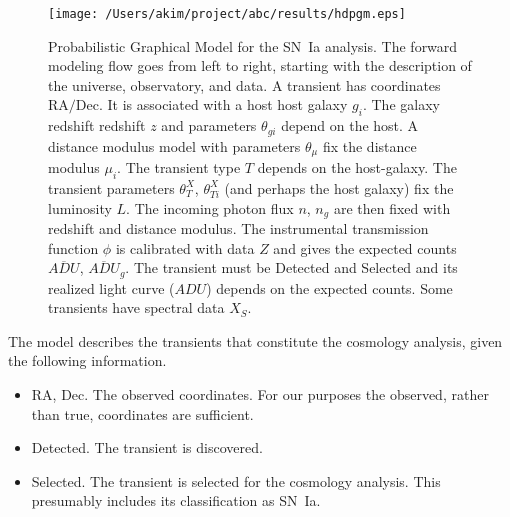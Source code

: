 \documentclass[preprint]{aastex}
\begin{document}
\begin{figure}[htbp] %
   \centering
   \texttt{[image: /Users/akim/project/abc/results/hdpgm.eps]} 
   \caption{Probabilistic Graphical Model for the SN~Ia analysis.  
   The forward modeling
   flow goes from left to right, starting with the description of the universe, observatory,
   and data.    A transient has
   coordinates  $\text{RA/Dec}$.  It is associated with a host host galaxy $g_i$.
   The galaxy redshift redshift $z$ and parameters $\theta_{gi}$ depend on the host.
   A distance modulus model with parameters $\theta_\mu$ fix the distance modulus $\mu_i$.
   The transient type $T$ depends on the host-galaxy.   The transient
   parameters $\theta_T^X$, $\theta_{Ti}^X$ (and perhaps the host galaxy) fix the luminosity $L$.       The 
   incoming photon flux $n$, $n_g$  are then fixed
   with redshift and distance modulus.
   The instrumental transmission function $\phi$ is calibrated with data ${Z}$ and
   gives the expected
   counts $\overline{\mathit{ADU}}$, $\overline{\mathit{ADU}}_g$. 
   The transient must be Detected and Selected and its realized light curve (${ADU}$) depends on the expected counts.  Some transients have spectral data
   ${X}_S$.
   \label{pgm:fig}}
\end{figure}


The model describes the transients that constitute the cosmology analysis, given the following
information.  
\begin{itemize}
\item ${\text{RA}}$, ${\text{Dec}}$.  The observed
coordinates.  For our purposes the observed, rather than true, coordinates are sufficient.
\item Detected.  The transient is discovered.
\item Selected. The transient is selected for the cosmology analysis.  This presumably
includes its classification as SN~Ia.
\end{itemize}
\end{document}
